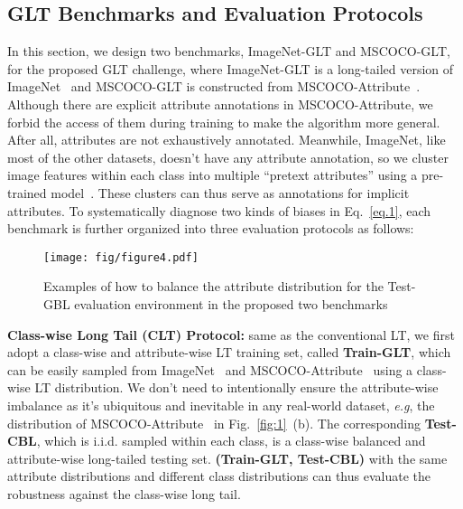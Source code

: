 \documentclass{article}
\def\eg{\emph{e.g}} \def\Eg{\emph{E.g}}
\begin{document}
\subsection{GLT Benchmarks and Evaluation Protocols} 

In this section, we design two benchmarks, ImageNet-GLT and MSCOCO-GLT, for the proposed GLT challenge, where ImageNet-GLT is a long-tailed version of ImageNet~\cite{russakovsky2015imagenet} and MSCOCO-GLT is constructed from MSCOCO-Attribute~\cite{patterson2016coco}. Although there are explicit attribute annotations in MSCOCO-Attribute, we forbid the access of them during training to make the algorithm more general. After all, attributes are not exhaustively annotated. Meanwhile, ImageNet, like most of the other datasets, doesn't have any attribute annotation, so we cluster image features within each class into multiple ``pretext attributes'' using a pre-trained model~\cite{NEURIPS2019_9015}. These clusters can thus serve as annotations for implicit attributes. To systematically diagnose two kinds of biases in Eq.~\eqref{eq.1}, each benchmark is further organized into three evaluation protocols as follows:

\begin{wrapfigure}{r}{90mm}
    \vspace{-2mm}
   \texttt{[image: fig/figure4.pdf]}
   \caption{Examples of how to balance the attribute distribution for the Test-GBL evaluation environment in the proposed two benchmarks}
   \label{fig:4} \vspace{-2mm}
\end{wrapfigure}

\noindent\textbf{Class-wise Long Tail (CLT) Protocol:} same as the conventional LT, we first adopt a class-wise and attribute-wise LT training set, called \textbf{Train-GLT}, which can be easily sampled from ImageNet~\cite{russakovsky2015imagenet} and MSCOCO-Attribute~\cite{patterson2016coco} using a class-wise LT distribution. We don't need to intentionally ensure the attribute-wise imbalance as it's ubiquitous and inevitable in any real-world dataset, \eg, the distribution of MSCOCO-Attribute~\cite{patterson2016coco} in Fig.~\ref{fig:1}~(b). The corresponding \textbf{Test-CBL}, which is i.i.d. sampled within each class, is a class-wise balanced and attribute-wise long-tailed testing set. \textbf{(Train-GLT, Test-CBL)} with the same attribute distributions and different class distributions can thus evaluate the robustness against the class-wise long tail.  
\end{document}
